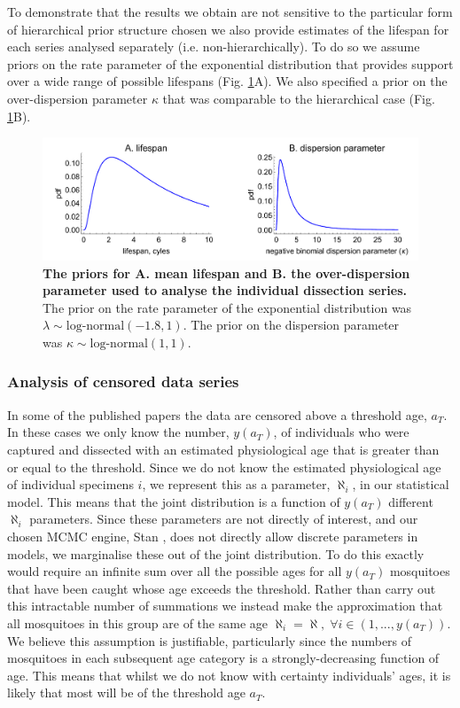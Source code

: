\documentclass[12pt]{article}
\begin{document}
{To demonstrate that the results we obtain are not sensitive to the particular form of hierarchical prior structure chosen we also provide estimates of the lifespan for each series analysed separately (i.e. non-hierarchically). To do so we assume priors on the rate parameter of the exponential distribution that provides support over a wide range of possible lifespans (Fig. \ref{fig:dissection_lifespanPrior_individual}A). We also specified a prior on the over-dispersion parameter $\kappa$ that was comparable to the hierarchical case (Fig. \ref{fig:dissection_lifespanPrior_individual}B).


\begin{figure}[ht]
	\centerline{\includegraphics[width=1\textwidth]{./Figure_files/dissection_lifespanPrior_individual.pdf}}
	\caption{\textbf{The priors for A. mean lifespan and B. the over-dispersion parameter used to analyse the individual dissection series.} The prior on the rate parameter of the exponential distribution was $\lambda\sim \text{log-normal}(-1.8,1)$. The prior on the dispersion parameter was $\kappa\sim \text{log-normal}(1,1)$.}\label{fig:dissection_lifespanPrior_individual}
\end{figure}

\subsubsection{Analysis of censored data series}\label{sec:dissection_censored}
In some of the published papers the data are censored above a threshold age, $a_T$. In these cases we only know the number, $y(a_T)$, of individuals who were captured and dissected with an estimated physiological age that is greater than or equal to the threshold. Since we do not know the estimated physiological age of individual specimens $i$, we represent this as a parameter, $\aleph_i$, in our statistical model. This means that the joint distribution is a function of $y(a_T)$ different $\aleph_i$ parameters. Since these parameters are not directly of interest, and our chosen MCMC engine, Stan \citep{stan-software:2014}, does not directly allow discrete parameters in models, we marginalise these out of the joint distribution. To do this exactly would require an infinite sum over all the possible ages for all $y(a_T)$ mosquitoes that have been caught whose age exceeds the threshold. Rather than carry out this intractable number of summations we instead make the approximation that all mosquitoes in this group are of the same age $\aleph_i = \aleph,\; \forall i \in (1,...,y(a_T))$. We believe this assumption is justifiable, particularly since the numbers of mosquitoes in each subsequent age category is a strongly-decreasing function of age. This means that whilst we do not know with certainty individuals' ages, it is likely that most will be of the threshold age $a_T$.

}
\end{document}
